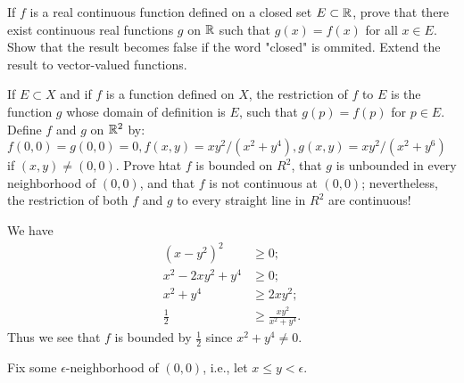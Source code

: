\begin{problem}
  If $f$ is a real continuous function defined on a closed set $E \subset \mathbb{R}$, prove that there exist continuous real functions $g$ on $\mathbb{R}$ such that $g(x) = f(x)$ for all $x \in E$.
  Show that the result becomes false if the word "closed" is ommited.
  Extend the result to vector-valued functions.
\end{problem}

\begin{solution}
\end{solution}

\setcounter{problem}{6}
\begin{problem}
  If $E \subset X$ and if $f$ is a function defined on $X$, the restriction of $f$ to $E$ is the function $g$ whose domain of definition is $E$, such that $g(p) = f(p)$ for $p \in E$.
  Define $f$ and $g$ on $\mathbb{R}^2$ by: $f(0, 0) = g(0, 0) = 0, f(x, y) = xy^2/(x^2 + y^4), g(x, y) = xy^2/(x^2 + y^6)$ if $(x, y) \neq (0, 0)$.
  Prove htat $f$ is bounded on $R^2$, that $g$ is unbounded in every neighborhood of $(0, 0)$, and that $f$ is not continuous at $(0, 0)$; nevertheless, the restriction of both $f$ and $g$ to every straight line in $R^2$ are continuous!
\end{problem}

\begin{solution}
  We have
  \[\begin{aligned}
    (x - y^2)^2 &\ge 0;\\
    x^2 - 2xy^2 + y^4 &\ge 0;\\
    x^2 + y^4 &\ge 2xy^2;\\
    \frac{1}{2} &\ge \frac{xy^2}{x^2 + y^4}.
  \end{aligned}\]
  Thus we see that $f$ is bounded by $\frac{1}{2}$ since $x^2 + y^4 \neq 0$.

  Fix some $\epsilon$-neighborhood of $(0, 0)$, i.e., let $x \le y < \epsilon$.
\end{solution}

